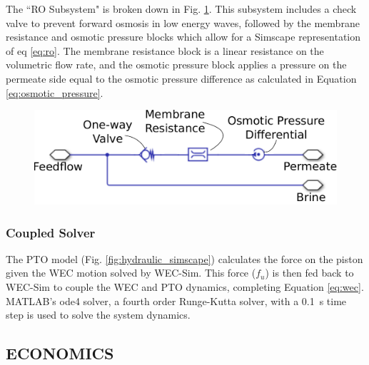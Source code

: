 \documentclass[twocolumn,10pt]{asme2e}
\begin{document}
The ``RO Subsystem" is broken down in Fig. \ref{fig:ro_simscape}. This subsystem includes a check valve to prevent forward osmosis in low energy waves, followed by the membrane resistance and osmotic pressure blocks which allow for a Simscape representation of eq \ref{eq:ro}. The membrane resistance block is a linear resistance on the volumetric flow rate, and the osmotic pressure block applies a pressure on the permeate side equal to the osmotic pressure difference as calculated in Equation \ref{eq:osmotic_pressure}.

\begin{figure}[h]
    \centering
    \includegraphics[width=0.7\linewidth]{../figs/simscape_ro.pdf}
    \label{fig:ro_simscape}
\end{figure}
\vspace{-3em}

\subsubsection{Coupled Solver}

The PTO model (Fig. \ref{fig:hydraulic_simscape}) calculates the force on the piston given the WEC motion solved by WEC-Sim. This force ($f_u$) is then fed back to WEC-Sim to couple the WEC and PTO dynamics, completing Equation \ref{eq:wec}. MATLAB's ode4 solver, a fourth order Runge-Kutta solver, with a 0.1~s time step is used to solve the system dynamics. 


\subsection{ECONOMICS} \label{sec:econ}
\end{document}

